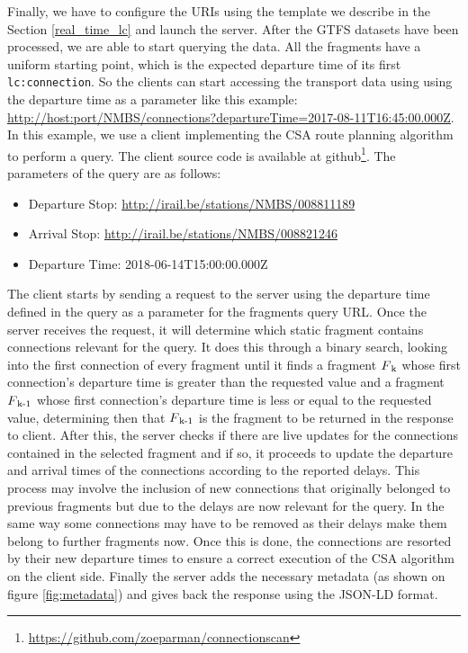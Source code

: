 \documentclass[sw]{iosart2x}
\begin{document}
	Finally, we have to configure the URIs using the template we describe in the Section \ref{real_time_lc} and launch the server. After the GTFS datasets have been processed, we are able to start querying the data. All the fragments have a uniform starting point, which is the expected departure time of its first \texttt{lc:connection}. So the clients can start accessing the transport data using using the departure time as a parameter like this example: \url{http://host:port/NMBS/connections?departureTime=2017-08-11T16:45:00.000Z}. In this example, we use a client implementing the CSA route planning algorithm to perform a query. The client source code is available at github\footnote{\url{https://github.com/zoeparman/connectionscan}}. The parameters of the query are as follows:
	\begin{itemize}
	\item Departure Stop: \url{http://irail.be/stations/NMBS/008811189}
	\item Arrival Stop: \url{http://irail.be/stations/NMBS/008821246}
	\item Departure Time: 2018-06-14T15:00:00.000Z
	\end{itemize}
	
	The client starts by sending a request to the server using the departure time defined in the query as a parameter for the fragments query URL. Once the server receives the request, it will determine which static fragment contains connections relevant for the query. It does this through a binary search, looking into the first connection of every fragment until it finds a fragment \(F\textsubscript{k}\) whose first connection's departure time is greater than the requested value and a fragment \(F\textsubscript{k-1}\) whose first connection's departure time is less or equal to the requested value, determining then that \(F\textsubscript{k-1}\) is the fragment to be returned in the response to client. After this, the server checks if there are live updates for the connections contained in the selected fragment and if so, it proceeds to update the departure and arrival times of the connections according to the reported delays. This process may involve the inclusion of new connections that originally belonged to previous fragments but due to the delays are now relevant for the query. In the same way some connections may have to be removed as their delays make them belong to further fragments now. Once this is done, the connections are resorted by their new departure times to ensure a correct execution of the CSA algorithm on the client side. Finally the server adds the necessary metadata (as shown on figure \ref{fig:metadata}) and gives back the response using the JSON-LD format.
	
\end{document}
